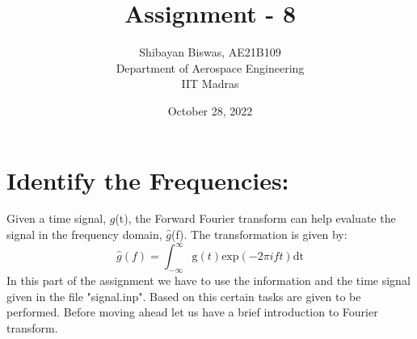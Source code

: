 \documentclass[12pt,a4paper]{article}
\author{Shibayan Biswas, AE21B109\\ Department of Aerospace Engineering\\ IIT Madras}
\title{Assignment - 8}
\date{October 28, 2022}
\begin{document}
\maketitle
\hline
\section{Identify the Frequencies:}
Given a time signal, $g$(t), the Forward Fourier transform can help evaluate the signal in the frequency domain, $\hat{g}$(f). The transformation is given by:
\begin{equation}
    \text{$\hat{g}$}(f) = \text{$\int_{-\infty}^{\infty}{\text{g}(t) \text{exp}(-2 \pi ift) \text{dt}}$}
\end{equation}
In this part of the assignment we have to use the information and the time signal given in the file "signal.inp". Based on this certain tasks are given to be performed. Before moving ahead let us have a brief introduction to Fourier transform.
\end{document}

